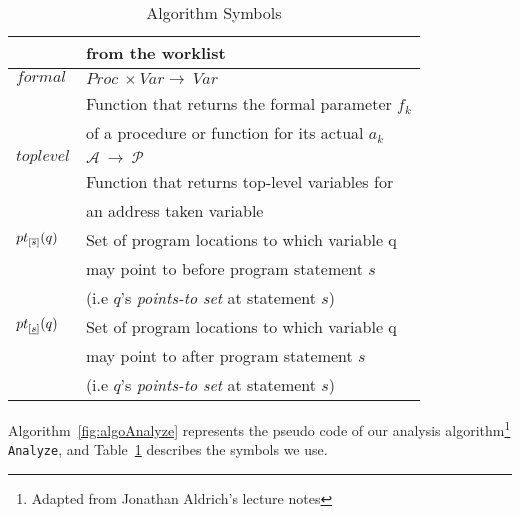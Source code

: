 \begin{table}
\begin{tabular}{|l|l|}
								&	from the worklist									\\ \hline
$\mathit{formal}$				&	$\mathit{Proc}\ \times \mathit{Var} \rightarrow\ \mathit{Var}$ 	\\
								& 	Function that returns the formal parameter $f_k$	\\
								&	of a procedure or function for its actual $a_k$		\\ \hline	
$\mathit{toplevel}$				&	$\mathcal{A}\ \rightarrow\ \mathcal{P}$ 			\\
								& 	Function that returns top-level variables for		\\
								&	an address taken variable							\\ \hline															
${pt}_{[\overline{s}]}(q)$	&	Set of program locations to which variable q		\\
								&	may point to before program statement $s$			\\
								& 	(i.e $q$'s \textit{points-to set} at statement $s$)	\\ \hline					
${pt}_{[\underline{s}]}(q)$	&	Set of program locations to which variable q		\\
								&	may point to after program statement $s$			\\
								& 	(i.e $q$'s \textit{points-to set} at statement $s$)	\\ \hline
\end{tabular}
\caption{Algorithm Symbols}\label{symTable}
\end{table}

Algorithm~\ref{fig:algoAnalyze} represents the pseudo code of
our analysis algorithm\footnote{Adapted from Jonathan Aldrich's
lecture notes} \texttt{Analyze}, and Table~\ref{symTable}
describes the symbols we use.

